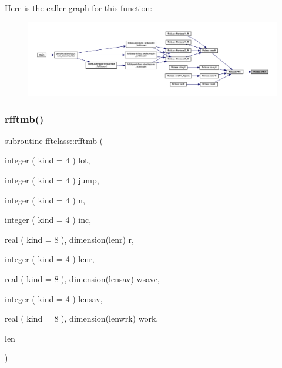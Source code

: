 Here is the caller graph for this function\+:\nopagebreak
\begin{figure}[H]
\begin{center}
\leavevmode
\includegraphics[width=350pt]{namespacefftclass_a122822a405cd96e5df936acaad731746_icgraph}
\end{center}
\end{figure}
\mbox{\label{namespacefftclass_acc4295c5a3646519e26c3dd5ae66418d}} 
\subsubsection{\texorpdfstring{rfftmb()}{rfftmb()}}
{\footnotesize\ttfamily subroutine fftclass\+::rfftmb (\begin{DoxyParamCaption}\item[{integer ( kind = 4 )}]{lot,  }\item[{integer ( kind = 4 )}]{jump,  }\item[{integer ( kind = 4 )}]{n,  }\item[{integer ( kind = 4 )}]{inc,  }\item[{real ( kind = 8 ), dimension(lenr)}]{r,  }\item[{integer ( kind = 4 )}]{lenr,  }\item[{real ( kind = 8 ), dimension(lensav)}]{wsave,  }\item[{integer ( kind = 4 )}]{lensav,  }\item[{real ( kind = 8 ), dimension(lenwrk)}]{work,  }\item[{}]{len }\end{DoxyParamCaption})}

